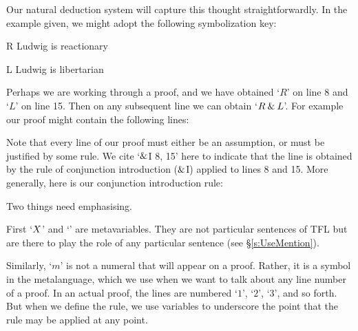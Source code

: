 Our natural deduction system will capture this thought straightforwardly. In the example given, we might adopt the following symbolization key:
	\begin{ekey}
		\item[R] Ludwig is reactionary
		\item[L] Ludwig is libertarian
	\end{ekey}
Perhaps we are working through a proof, and we have obtained `$R$' on line 8 and `$L$' on line 15. Then on any subsequent line we can obtain `$R \mathbin{\&} L$'. For example our proof might contain the following lines:
\begin{pf}
	\hspace*{1em}
	\hspace*{1em}
	 \hspace*{1em}
\end{pf}
Note that every line of our proof must either be an assumption, or must be justified by some rule. We cite `$\mathbin{\&}$I 8, 15' here to indicate that the line is obtained by the rule of conjunction introduction ($\mathbin{\&}$I) applied to lines 8 and 15. 
More generally, here is our conjunction introduction rule:


Two things need emphasising. 

First `$X$' and `\metaY' are metavariables. They are not particular sentences of TFL but are there to play the role of any particular sentence (see \S\ref{s:UseMention}). 




Similarly, `$m$' is not a numeral that will appear on a proof. Rather, it is a symbol in the metalanguage, which we use when we want to talk about any line number of a proof. In an actual proof, the lines are numbered `$1$', `$2$', `$3$', and so forth. But when we define the rule, we use variables to underscore the point that the rule may be applied at any point.


